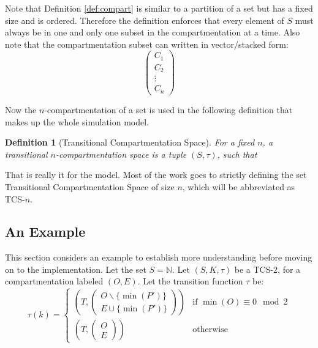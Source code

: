 \documentclass{article}
\newtheorem{definition}{Definition}
\begin{document}
Note that Definition \ref{def:compart} is similar to a partition of a set but has a fixed size and is ordered. Therefore the definition enforces that every element of \(S\) must always be in one and only one subset in the compartmentation at a time. Also note that the compartmentation subset can written in vector/stacked form:
\[
    \begin{pmatrix}
        C_1 \\ C_2 \\ \vdots \\ C_n
    \end{pmatrix}    
\]

Now the \(n\)-compartmentation of a set is used in the following definition that makes up the whole simulation model.

\begin{definition}[Transitional Compartmentation Space]
    For a fixed \(n\), a transitional \(n\)-compartmentation space is a tuple \((S, \tau)\), such that
\end{definition}

That is really it for the model. Most of the work goes to strictly defining the set Transitional Compartmentation Space of size \(n\), which will be abbreviated as TCS-\(n\).

\subsection{An Example}
This section considers an example to establish more understanding before moving on to the implementation. Let the set \(S = \mathbb{N}\). Let \((S, K, \tau)\) be a TCS-2, for a compartmentation labeled \((O, E)\). Let the transition function \(\tau\) be:
\[
\tau(k) = \begin{cases}
    (T, \begin{pmatrix}
        O\backslash\{\min(P')\} \\ E \cup \{\min(P')\}
    \end{pmatrix}) &\text{if } \min(O) \equiv 0 \mod{2} \\[1cm]
    (T, \begin{pmatrix}
        O \\ E
    \end{pmatrix})  &\text{otherwise}
\end{cases}    
\]
\end{document}
